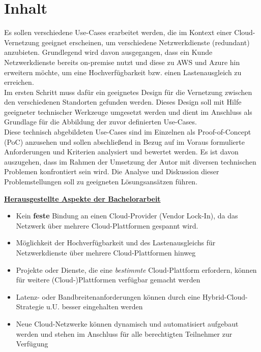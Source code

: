 \section{Inhalt}
Es sollen verschiedene Use-Cases erarbeitet werden, die im Kontext einer Cloud-Vernetzung geeignet erscheinen, um verschiedene Netzwerkdienste (redundant) anzubieten. Grundlegend wird davon ausgegangen, dass ein Kunde Netzwerkdienste bereits on-premise nutzt und diese zu AWS und Azure hin erweitern möchte, um eine Hochverfügbarkeit bzw. einen Lastenausgleich zu erreichen.\\
Im ersten Schritt muss dafür ein geeignetes Design für die Vernetzung zwischen den verschiedenen Standorten gefunden werden. Dieses Design soll mit Hilfe geeigneter technischer Werkzeuge umgesetzt werden und dient im Anschluss als Grundlage für die Abbildung der zuvor definierten Use-Cases.\\
Diese technisch abgebildeten Use-Cases sind im Einzelnen als Proof-of-Concept (PoC) anzusehen und sollen abschließend in Bezug auf im Voraus formulierte Anforderungen und Kriterien analysiert und bewertet werden. Es ist davon auszugehen, dass im Rahmen der Umsetzung der Autor mit diversen technischen Problemen konfrontiert sein wird. Die Analyse und Diskussion dieser Problemstellungen soll zu geeigneten Lösungsansätzen führen.

\textbf{\underline{Herausgestellte Aspekte der Bachelorarbeit}}
\begin{itemize}
    \item Kein \textbf{feste} Bindung an einen Cloud-Provider (\glqq Vendor Lock-In\grqq{}), da das Netzwerk über mehrere Cloud-Plattformen gespannt wird.
    \item Möglichkeit der Hochverfügbarkeit und des Lastenausgleichs für Netzwerkdienste über mehrere Cloud-Plattformen hinweg
    \item Projekte oder Dienste, die eine \textit{bestimmte} Cloud-Plattform erfordern, können für weitere (Cloud-)Plattformen verfügbar gemacht werden
    \item Latenz- oder Bandbreitenanforderungen können durch eine Hybrid-Cloud-Strategie u.U. besser eingehalten werden
    \item Neue Cloud-Netzwerke können dynamisch und automatisiert aufgebaut werden und stehen im Anschluss für alle berechtigten Teilnehmer zur Verfügung
\end{itemize}

